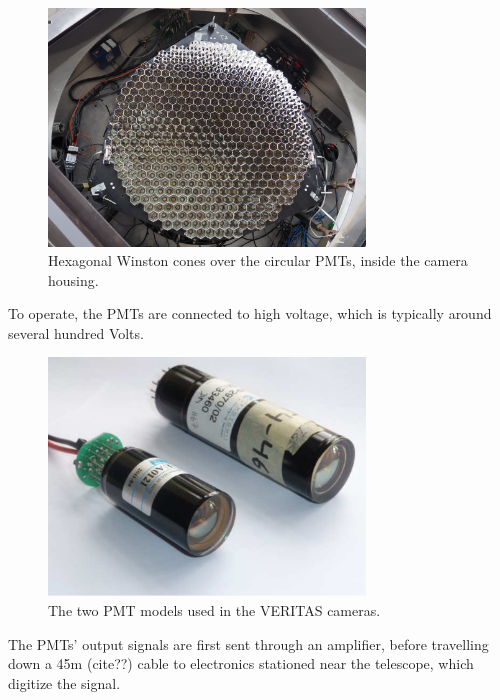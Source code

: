 \begin{figure}[ht]
  \begin{center}
    \includegraphics[width=0.75\textwidth]{images/winston_cones_t2}
    \caption[Winston Cones]{Hexagonal Winston cones over the circular PMTs, inside the camera housing.}\label{fig:winstcones}
  \end{center}
\end{figure}

To operate, the PMTs are connected to high voltage, which is typically around several hundred Volts.

\begin{figure}[ht]
  \begin{center}
    \includegraphics[width=0.75\textwidth]{images/pmt_models}
    \caption[PMT Models]{The two PMT models used in the VERITAS cameras. \cite{pmtmodels}}\label{fig:pmtmodels}
  \end{center}
\end{figure}

The PMTs' output signals are first sent through an amplifier, before travelling down a \nicetilde45m (cite??) cable to electronics stationed near the telescope, which digitize the signal.

